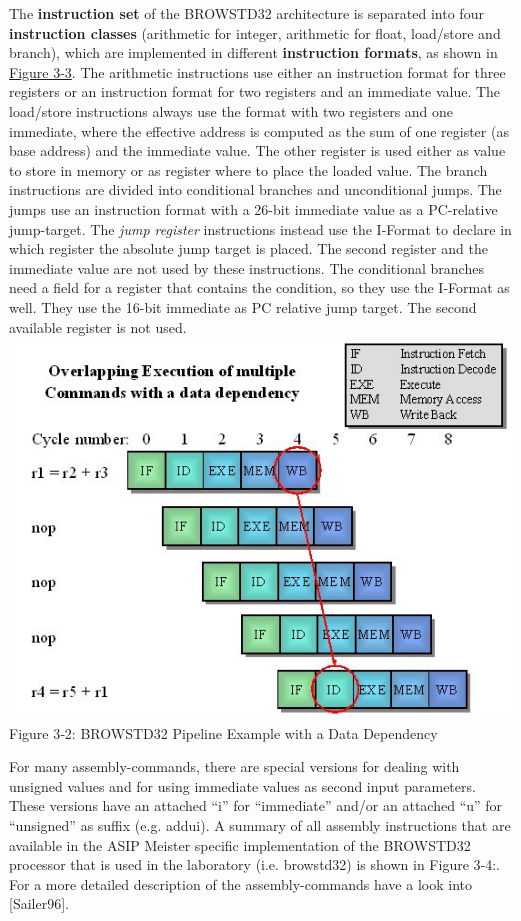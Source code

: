\documentclass[
]{article}
\begin{document}
The \textbf{instruction set} of the BROWSTD32 architecture is separated
into four \textbf{instruction classes} (arithmetic for integer,
arithmetic for float, load/store and branch), which are implemented in
different \textbf{instruction formats}, as shown in
\protect\hyperlink{Fig33}{Figure 3-3}. The arithmetic instructions use
either an instruction format for three registers or an instruction
format for two registers and an immediate value. The load/store
instructions always use the format with two registers and one immediate,
where the effective address is computed as the sum of one register (as
base address) and the immediate value. The other register is used either
as value to store in memory or as register where to place the loaded
value. The branch instructions are divided into conditional branches and
unconditional jumps. The jumps use an instruction format with a 26-bit
immediate value as a PC-relative jump-target. The \emph{jump register}
instructions instead use the I-Format to declare in which register the
absolute jump target is placed. The second register and the immediate
value are not used by these instructions. The conditional branches need
a field for a register that contains the condition, so they use the
I-Format as well. They use the 16-bit immediate as PC relative jump
target. The second available register is not used.
\includegraphics[width=6.09196in,height=3.97917in]{3-2.png}
Figure 3‑2\protect\hypertarget{Fig32}{}{}: BROWSTD32 Pipeline Example
with a Data Dependency

For many assembly-commands, there are special versions for dealing with
unsigned values and for using immediate values as second input
parameters. These versions have an attached ``i'' for ``immediate''
and/or an attached ``u'' for ``unsigned'' as suffix (e.g. addui). A
summary of all assembly instructions that are available in the ASIP
Meister specific implementation of the BROWSTD32 processor that is used
in the laboratory (i.e. browstd32) is shown in Figure 3‑4:. For a more
detailed description of the assembly-commands have a look into
{[}Sailer96{]}.
\end{document}
